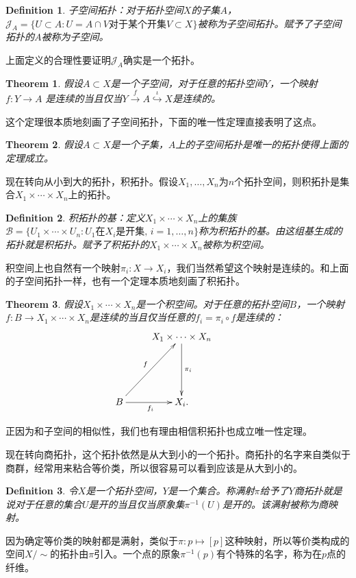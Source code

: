 \documentclass[10pt]{book}
\theoremstyle{plain}%
\newtheorem{theo}{Theorem}%
\newtheorem{defi}{Definition}%
\begin{document}
\begin{defi}
子空间拓扑：对于拓扑空间$X$的子集$A$，$\mathcal{J}_A=\{U\subset A: U=A \cap V \text{对于某个开集}V\subset X\}$被称为子空间拓扑。赋予了子空间拓扑的$A$被称为子空间。
\end{defi}
上面定义的合理性要证明$\mathcal{J}_A$确实是一个拓扑。
\begin{theo}
假设$A\subset X$是一个子空间，对于任意的拓扑空间$Y$，一个映射$f:Y \rightarrow A$ 是连续的当且仅当$Y \xrightarrow{f} A \stackrel{\iota}{\hookrightarrow} X$是连续的。
\end{theo}
这个定理很本质地刻画了子空间拓扑，下面的唯一性定理直接表明了这点。
\begin{theo}
假设$A\subset X$是一个子集，$A$上的子空间拓扑是唯一的拓扑使得上面的定理成立。
\end{theo}

现在转向从小到大的拓扑，积拓扑。假设$X_1,\dots,X_n$为$n$个拓扑空间，则积拓扑是集合$X_1\times\cdots\times X_n$上的拓扑。

\begin{defi}
积拓扑的基：定义$X_1\times\cdots\times X_n$上的集族$\mathcal{B}=\{U_1\times \cdots \times U_n : U_1 \text{在}   X_i\text{是开集},\,i=1,\dots,n\}$称为积拓扑的基。由这组基生成的拓扑就是积拓扑。赋予了积拓扑的$X_1\times\cdots\times X_n$被称为积空间。
\end{defi}
积空间上也自然有一个映射$\pi_i:X \to X_i$，我们当然希望这个映射是连续的。和上面的子空间拓扑一样，也有一个定理本质地刻画了积拓扑。
\begin{theo}
假设$X_1\times\cdots\times X_n$是一个积空间。对于任意的拓扑空间$B$，一个映射$f:B\to X_1\times\cdots\times X_n$是连续的当且仅当任意的$f_i=\pi_i\circ f$是连续的：
\[
   \xymatrix{
    &  X_1\times\cdots\times X_n \ar[dd]^{\pi_i} \\
    &&\\
   B \ar[uur]^{f}  \ar[r]_{f_i}  &X_i.
    }
\]
\end{theo}
正因为和子空间的相似性，我们也有理由相信积拓扑也成立唯一性定理。

现在转向商拓扑，这个拓扑依然是从大到小的一个拓扑。商拓扑的名字来自类似于商群，经常用来粘合等价类，所以很容易可以看到应该是从大到小的。

\begin{defi}
令$X$是一个拓扑空间，$Y	$是一个集合。称满射$\pi$给予了$Y$商拓扑就是说对于任意的集合$U$是开的当且仅当原象集$\pi^{-1}(U)$是开的。该满射被称为商映射。
\end{defi}

因为确定等价类的映射都是满射，类似于$\pi:p\mapsto [p]$这种映射，所以等价类构成的空间$X/\sim$的拓扑由$\pi$引入。一个点的原象$\pi^{-1}(p)$有个特殊的名字，称为在$p$点的纤维。
\end{document}
